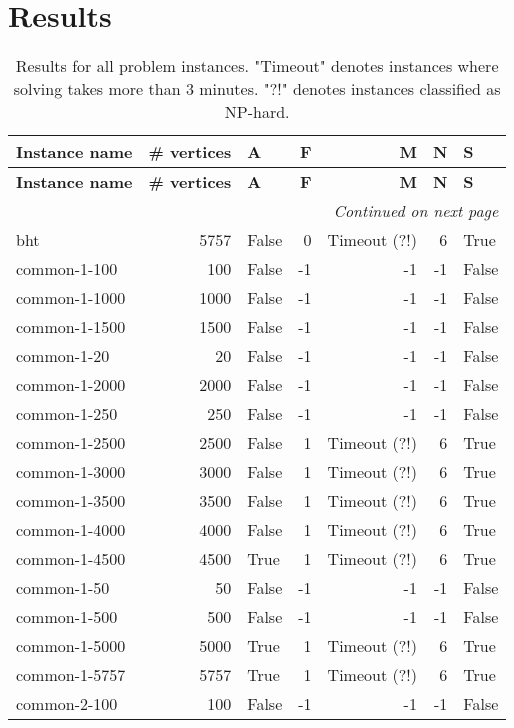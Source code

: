 \section{Results}
 \begin{longtable}{lrlrrrl} \caption{Results for all problem instances. "Timeout" denotes instances where solving takes more than 3 minutes. "?!" denotes instances classified as NP-hard.}\label{table:results}\\ \toprule  \textbf{Instance name}& \textbf{\# vertices}& \textbf{A}& \textbf{F}& \textbf{M}& \textbf{N}& \textbf{S}\\
\midrule
\endfirsthead
\toprule
 \textbf{Instance name}& \textbf{\# vertices}& \textbf{A}& \textbf{F}& \textbf{M}& \textbf{N}& \textbf{S}\\
\midrule
\endhead
\midrule
\multicolumn{7}{r}{\textit{Continued on next page}} \\
\midrule
\endfoot
\bottomrule
\endlastfoot
bht & 5757 & False & 0 & Timeout (?!) & 6 & True \\
common-1-100 & 100 & False & -1 & -1 & -1 & False \\
common-1-1000 & 1000 & False & -1 & -1 & -1 & False \\
common-1-1500 & 1500 & False & -1 & -1 & -1 & False \\
common-1-20 & 20 & False & -1 & -1 & -1 & False \\
common-1-2000 & 2000 & False & -1 & -1 & -1 & False \\
common-1-250 & 250 & False & -1 & -1 & -1 & False \\
common-1-2500 & 2500 & False & 1 & Timeout (?!) & 6 & True \\
common-1-3000 & 3000 & False & 1 & Timeout (?!) & 6 & True \\
common-1-3500 & 3500 & False & 1 & Timeout (?!) & 6 & True \\
common-1-4000 & 4000 & False & 1 & Timeout (?!) & 6 & True \\
common-1-4500 & 4500 & True & 1 & Timeout (?!) & 6 & True \\
common-1-50 & 50 & False & -1 & -1 & -1 & False \\
common-1-500 & 500 & False & -1 & -1 & -1 & False \\
common-1-5000 & 5000 & True & 1 & Timeout (?!) & 6 & True \\
common-1-5757 & 5757 & True & 1 & Timeout (?!) & 6 & True \\
common-2-100 & 100 & False & -1 & -1 & -1 & False \\

\end{longtable}
